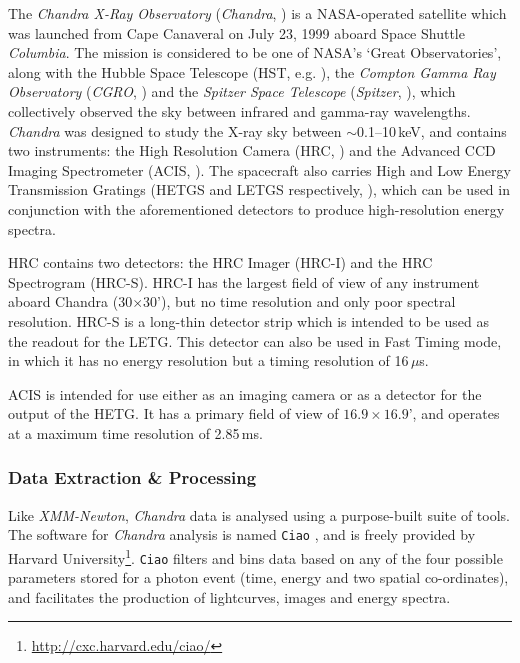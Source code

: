 \par The \textit{Chandra X-Ray Observatory} (\textit{Chandra}, \citealp{Weisskopf_Chandra}) is a NASA-operated satellite which was launched from Cape Canaveral on July 23, 1999 aboard Space Shuttle \textit{Columbia}.  The mission is considered to be one of NASA's `Great Observatories', along with the Hubble Space Telescope (HST, e.g. \citealp{Holtzman_Hubble}), the \textit{Compton Gamma Ray Observatory} (\textit{CGRO}, \citealp{Gehrels_CGRO}) and the \textit{Spitzer Space Telescope} (\textit{Spitzer}, \citealp{Fanson_Spitzer}), which collectively observed the sky between infrared and gamma-ray wavelengths.  \textit{Chandra} was designed to study the X-ray sky between $\sim$0.1--10\,keV, and contains two instruments: the High Resolution Camera (HRC, \citealp{Kenter_HRCI}) and the Advanced CCD Imaging Spectrometer (ACIS, \citealp{Nousek_ACIS}).  The spacecraft also carries High and Low Energy Transmission Gratings (HETGS and LETGS respectively, \citealp{Markert_HETG,Brinkman_LETG}), which can be used in conjunction with the aforementioned detectors to produce high-resolution energy spectra.
\par HRC contains two detectors: the HRC Imager (HRC-I) and the HRC Spectrogram (HRC-S).  HRC-I has the largest field of view of any instrument aboard Chandra (30$\times$30'), but no time resolution and only poor spectral resolution.  HRC-S is a long-thin detector strip which is intended to be used as the readout for the LETG.  This detector can also be used in Fast Timing mode, in which it has no energy resolution but a timing resolution of 16\,$\mu$s.
\par ACIS is intended for use either as an imaging camera or as a detector for the output of the HETG.  It has a primary field of view of $16.9\times16.9$', and operates at a maximum time resolution of 2.85\,ms.

\subsubsection{Data Extraction \& Processing}
\par Like \textit{XMM-Newton}, \textit{Chandra} data is analysed using a purpose-built suite of tools.  The software for \textit{Chandra} analysis is named \texttt{Ciao} \citep{Fruscione_Ciao}, and is freely provided by Harvard University\footnote{\url{http://cxc.harvard.edu/ciao/}}.  \texttt{Ciao} filters and bins data based on any of the four possible parameters stored for a photon event (time, energy and two spatial co-ordinates), and facilitates the production of lightcurves, images and energy spectra.

